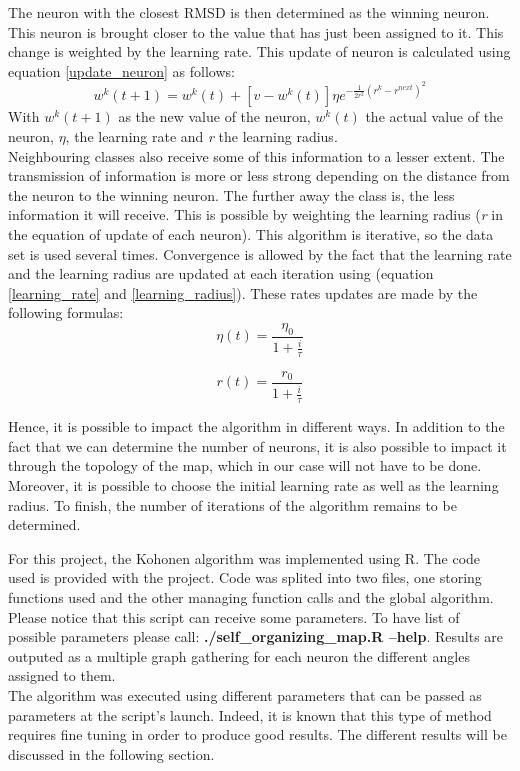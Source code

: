 \documentclass[11pt,a4paper]{article}
\begin{document}
    The neuron with the closest RMSD is then determined as the winning neuron. This neuron is brought closer to the value that has just been assigned to it. This change is weighted by the learning rate. This update of neuron is calculated using equation \ref{update_neuron} as follows:
    \begin{equation}
        \label{update_neuron}
        w^{k}(t+1) = w^{k}(t) + \left [ v - w^{k}(t) \right ]\eta e^{-\frac{1}{2r^{2}}(r^{k} - r^{next})^{2}}
    \end{equation}
    With $w^{k}(t+1)$ as the new value of the neuron, $w^{k}(t)$ the actual value of the neuron, $\eta$, the learning rate and \textit{r} the learning radius.\\
    Neighbouring classes also receive some of this information to a lesser extent. The transmission of information is more or less strong depending on the distance from the neuron to the winning neuron. The further away the class is, the less information it will receive. This is possible by weighting the learning radius (\textit{r} in the equation of update of each neuron).
    This algorithm is iterative, so the data set is used several times. Convergence is allowed by the fact that the learning rate  and the learning radius are updated at each iteration using (equation \ref{learning_rate} and \ref{learning_radius}). These rates updates are made by the following formulas:
    \begin{equation}
        \label{learning_rate}
       \eta (t) = \frac{\eta _{0}}{1+\frac{i}{\tau }}
    \end{equation}
    
    \begin{equation}
        \label{learning_radius}
       r(t) = \frac{r_{0}}{1+\frac{i}{\tau }}
    \end{equation}
    
    Hence, it is possible to impact the algorithm in different ways. In addition to the fact that we can determine the number of neurons, it is also possible to impact it through the topology of the map, which in our case will not have to be done. Moreover, it is possible to choose the initial learning rate as well as the learning radius. To finish, the number of iterations of the algorithm remains to be determined.
    
    For this project, the Kohonen algorithm was implemented using R. The code used is provided with the project. Code was splited into two files, one storing functions used and the other managing function calls and the global algorithm. Please notice that this script can receive some parameters. To have list of possible parameters please call: \textbf{./self\_organizing\_map.R --help}. Results are outputed as a multiple graph gathering for each neuron the different angles assigned to them.\\
    The algorithm was executed using different parameters that can be passed as parameters at the script's launch. Indeed, it is known that this type of method requires fine tuning in order to produce good results. The different results will be discussed in the following section.
    
\end{document}
